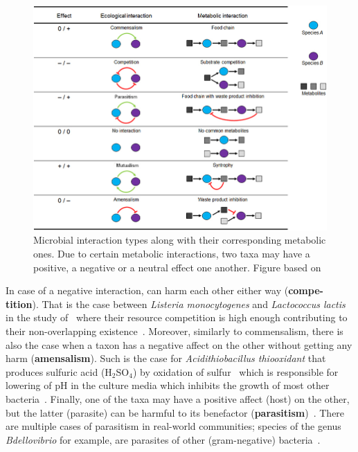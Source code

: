       \begin{figure}[!h]
         \centering
         \includegraphics[width=.9\textwidth]{figures/interaction_types.jpg}
         \caption[Microbial interactions types]{Microbial interaction types along 
         with their corresponding metabolic ones.
         Due to certain metabolic interactions, two taxa may have a positive, a negative
         or a neutral effect one another. 
         Figure based on \cite{perez2016metabolic}}
         \label{fig:micro-inter-types}
      \end{figure}

      In case of a negative interaction, can harm each other either way (\textbf{compe-tition}). 
      That is the case between 
      \textit{Listeria monocytogenes} and \textit{Lactococcus lactis} in the study of~\citeauthor{freilich2010large} where their resource competition is high enough
      contributing to their non-overlapping existence~\cite{freilich2010large}.
      Moreover, similarly to commensalism, 
      there is also the case when a taxon has a negative affect on the other
      without getting any harm (\textbf{amensalism}). 
      Such is the case for \textit{Acidithiobacillus thiooxidant} that produces
      sulfuric acid (H$_2$SO$_4$) by oxidation of sulfur~\cite{bobadilla2013stoichiometric} which is responsible for lowering of pH in the culture media which inhibits the growth of most other bacteria~\cite{jin2018ph}.
      Finally, one of the taxa may have a positive affect (host) on the other, but the 
      latter (parasite) can be harmful to its benefactor (\textbf{parasitism})~\cite{faust2012microbial}. 
      There are multiple cases of parasitism in real-world communities; 
      species of the genus \textit{Bdellovibrio} for example, are parasites of other (gram-negative) bacteria~\cite{stolp1979interactions}.

